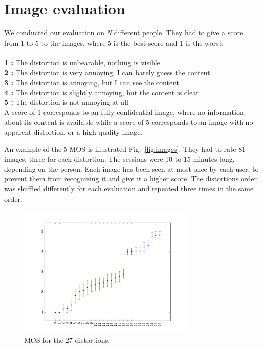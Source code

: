 \documentclass{article}
\begin{document}
\section{Image evaluation}
\label{sec:evaluation}
We conducted our evaluation on \textit{N} different people. They had to give a score from 1 to 5 to the images, where 5 is the best score and 1 is the worst:\\\\
\textbf{1 :} The distortion is unbearable, nothing is visible\\
\textbf{2 :} \small{The distortion is very annoying, I can barely guess the content}\normalsize{}\\
\textbf{3 :} The distortion is annoying, but I can see the content\\
\textbf{4 :} The distortion is slightly annoying, but the content is clear\\
\textbf{5 :} The distortion is not annoying at all \\

A score of 1 corresponds to an fully confidential image, where no information about its content is available while a score of 5 corresponds to an image with no apparent distortion, or a high quality image.

An example of the 5 MOS is illustrated Fig.~\ref{fig:images}. They had to rate 81 images, three for each distortion. The sessions were 10 to 15 minutes long, depending on the person. Each image has been seen at most once by each user, to prevent them from recognizing it and give it a higher score. The distortions order was shuffled differently for each evaluation and repeated three times in the same order. %

\begin{figure}[H]
  \centering
  \includegraphics[width=8.5cm]{figures/mos}
  \vspace{-5mm}
  \caption{MOS for the 27 distortions.\label{fig:mos} }
\end{figure}
\end{document}
